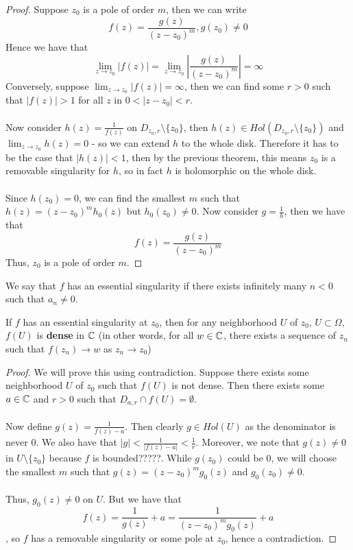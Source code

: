 \begin{proof}
Suppose $z_0$ is a pole of order $m$, then we can write
\[f(z) = \frac{g(z)}{(z - z_0)^m}, g(z_0) \neq 0\]
Hence we have that
\[\lim_{z \to z_0} |f(z)| = \lim_{z \to z_0} |\frac{g(z)}{(z - z_0)^m}| = \infty\]
Conversely, suppose $\lim_{z \to z_0} |f(z)| = \infty$, then we can find some $r > 0$ such that $|f(z)| > 1$ for all $z$ in $0 < |z - z_0| < r$.\\\\
Now consider $h(z) = \frac{1}{f(z)}$ on $D_{z_0, r} \setminus \{z_0\}$, then $h(z) \in Hol(D_{z_0, r} \setminus \{z_0\})$ and $\lim_{z \to z_0} h(z) = 0$ - so we can extend $h$ to the whole disk. Therefore it has to be the case that $|h(z)| < 1$, then by the previous theorem, this means $z_0$ is a removable singularity for $h$, so in fact $h$ is holomorphic on the whole disk.\\\\
Since $h(z_0) = 0$, we can find the smallest $m$ such that $h(z) = (z - z_0)^m h_0(z)$ but $h_0(z_0) \neq 0$. Now consider $g = \frac{1}{h}$, then we have that
\[f(z) = \frac{g(z)}{(z - z_0)^m}\]
Thus, $z_0$ is a pole of order $m$.
\end{proof}

We say that $f$ has an essential singularity if there exists infinitely many $n < 0$ such that $a_n \neq 0$.

\begin{theorem}
If $f$ has an essential singularity at $z_0$, then for any neighborhood $U$ of $z_0$, $U \subset \Omega$, $f(U)$ is \textbf{dense} in $\mathbb{C}$ (in other words, for all $w \in \mathbb{C}$, there exists a sequence of $z_n$ such that $f(z_n) \to w$ as $z_n \to z_0$)
\end{theorem}

\begin{proof}
We will prove this using contradiction. Suppose there exists some neighborhood $U$ of $z_0$ such that $f(U)$ is not dense. Then there exists some $a \in \mathbb{C}$ and $r > 0$ such that $D_{a, r} \cap f(U) = \emptyset$.\\\\
Now define $g(z) = \frac{1}{f(z) - a}$. Then clearly $g \in Hol(U)$ as the denominator is never $0$. We also have that $|g| < \frac{1}{|f(z) - a|} < \frac{1}{r}$. Moreover, we note that $g(z) \neq 0$ in $U \setminus \{z_0\}$ because $f$ is bounded?????. While $g(z_0)$ could be $0$, we will choose the smallest $m$ such that $g(z) = (z - z_0)^m g_0(z)$ and $g_0(z_0) \neq 0$.\\\\
Thus, $g_0(z) \neq 0$ on $U$. But we have that
\[f(z) = \frac{1}{g(z)} + a = \frac{1}{(z - z_0)^m g_0(z)} + a\]
, so $f$ has a removable singularity or some pole at $z_0$, hence a contradiction.
\end{proof}

